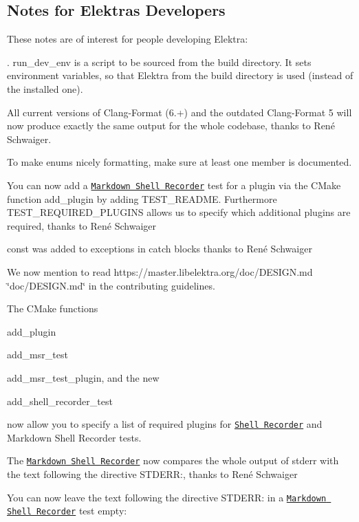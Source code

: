 \subsection*{Notes for Elektra\textquotesingle{}s Developers}

These notes are of interest for people developing Elektra\+:


\begin{DoxyItemize}
\item {\ttfamily . run\+\_\+dev\+\_\+env} is a script to be sourced from the build directory. It sets environment variables, so that Elektra from the build directory is used (instead of the installed one).
\item All current versions of Clang-\/\+Format (6.+) and the outdated Clang-\/\+Format 5 will now produce exactly the same output for the whole codebase, thanks to René Schwaiger.
\item To make enums nicely formatting, make sure at least one member is documented.
\item You can now add a \href{https://master.libelektra.org/tests/shell/shell_recorder/tutorial_wrapper}{\tt Markdown Shell Recorder} test for a plugin via the C\+Make function {\ttfamily add\+\_\+plugin} by adding {\ttfamily T\+E\+S\+T\+\_\+\+R\+E\+A\+D\+ME}. Furthermore {\ttfamily T\+E\+S\+T\+\_\+\+R\+E\+Q\+U\+I\+R\+E\+D\+\_\+\+P\+L\+U\+G\+I\+NS} allows us to specify which additional plugins are required, thanks to René Schwaiger
\item {\ttfamily const} was added to exceptions in catch blocks thanks to René Schwaiger
\item We now mention to read https\+://master.libelektra.\+org/doc/\+D\+E\+S\+I\+GN.md \char`\"{}doc/\+D\+E\+S\+I\+G\+N.\+md\char`\"{} in the contributing guidelines.
\item The C\+Make functions
\begin{DoxyItemize}
\item {\ttfamily add\+\_\+plugin}
\item {\ttfamily add\+\_\+msr\+\_\+test}
\item {\ttfamily add\+\_\+msr\+\_\+test\+\_\+plugin}, and the new
\item {\ttfamily add\+\_\+shell\+\_\+recorder\+\_\+test}

now allow you to specify a list of required plugins for \href{https://master.libelektra.org/tests/shell/shell_recorder}{\tt Shell Recorder} and Markdown Shell Recorder tests.
\end{DoxyItemize}
\item The \href{https://master.libelektra.org/tests/shell/shell_recorder/tutorial_wrapper}{\tt Markdown Shell Recorder} now compares the whole output of {\ttfamily stderr} with the text following the directive {\ttfamily S\+T\+D\+E\+RR\+:}, thanks to René Schwaiger
\item You can now leave the text following the directive {\ttfamily S\+T\+D\+E\+RR\+:} in a \href{https://master.libelektra.org/tests/shell/shell_recorder/tutorial_wrapper}{\tt Markdown Shell Recorder} test empty\+:


\end{DoxyItemize}
